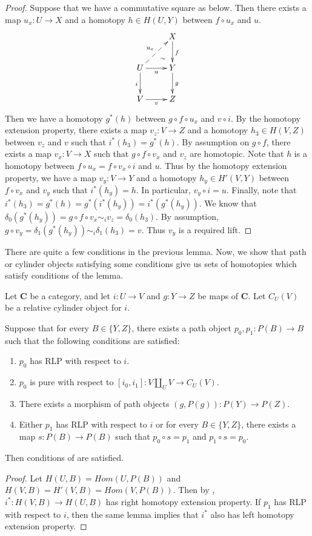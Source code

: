 \documentclass{amsart}
\theoremstyle{definition}
\newcommand{\cat}[1]{\mathbf{#1}}
\newcommand{\C}{\cat{C}}
\newcommand{\cyli}{i}
\begin{document}
\begin{proof}
Suppose that we have a commutative square as below.
Then there exists a map $u_x : U \to X$ and a homotopy $h \in H(U,Y)$ between $f \circ u_x$ and $u$.
\[ \xymatrix{   \ar@{}[dr]|(.7){\sim}                 & X \ar[d]^f \\
              U \ar@{-->}[ur]^{u_x} \ar[d]_i \ar[r]_u & Y \ar[d]^g \\
              V \ar[r]_v                              & Z
            } \]
Then we have a homotopy $g^*(h)$ between $g \circ f \circ u_x$ and $v \circ i$.
By the homotopy extension property, there exists a map $v_z : V \to Z$ and a homotopy $h_3 \in H(V,Z)$ between $v_z$ and $v$ such that $i^*(h_3) = g^*(h)$.
By assumption on $g \circ f$, there exists a map $v_x : V \to X$ such that $g \circ f \circ v_x$ and $v_z$ are homotopic.
Note that $h$ is a homotopy between $f \circ u_x = f \circ v_x \circ i$ and $u$.
Thus by the homotopy extension property, we have a map $v_y : V \to Y$ and a homotopy $h_y \in H'(V,Y)$ between $f \circ v_x$ and $v_y$ such that $i^*(h_y) = h$.
In particular, $v_y \circ i = u$.
Finally, note that $i^*(h_3) = g^*(h) = g^*(i^*(h_y)) = i^*(g^*(h_y))$.
We know that $\delta_0(g^*(h_y)) = g \circ f \circ v_x \sim_i v_z = \delta_0(h_3)$.
By assumption, $g \circ v_y = \delta_1(g^*(h_y)) \sim_i \delta_1(h_3) = v$.
Thus $v_y$ is a required lift.
\end{proof}

There are quite a few conditions in the previous lemma.
Now, we show that path or cylinder objects satisfying some conditions give us sets of homotopies which satisfy conditions of the lemma.

\begin{prop}
Let $\C$ be a category, and let $i : U \to V$ and $g : Y \to Z$ be maps of $\C$.
Let $C_U(V)$ be a relative cylinder object for $i$.

Suppose that for every $B \in \{ Y, Z \}$, there exists a path object $p_0,p_1 : P(B) \to B$ such that the following conditions are satisfied:
\begin{enumerate}
\item $p_0$ has RLP with respect to $i$.
\item $p_0$ is pure with respect to $[\cyli_0,\cyli_1] : V \amalg_U V \to C_U(V)$.
\item There exists a morphism of path objects $(g,P(g)) : P(Y) \to P(Z)$.
\item Either $p_1$ has RLP with respect to $i$ or for every $B \in \{ Y, Z \}$,
there exists a map $s : P(B) \to P(B)$ such that $p_0 \circ s = p_1$ and $p_1 \circ s = p_0$.
\end{enumerate}
Then conditions of  are satisfied.
\end{prop}
\begin{proof}
Let $H(U,B) = Hom(U,P(B))$ and $H(V,B) = H'(V,B) = Hom(V,P(B))$.
Then by , $i^* : H(V,B) \to H(U,B)$ has right homotopy extension property.
If $p_1$ has RLP with respect to $i$, then the same lemma implies that $i^*$ also has left homotopy extension property.
\end{proof}
\end{document}
